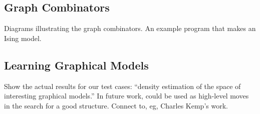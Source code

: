 \documentclass{article} %
\begin{document}
\subsection{Graph Combinators}

Diagrams illustrating the graph combinators. An example program that makes an Ising model.

\subsection{Learning Graphical Models}

Show the actual results for our test cases: ``density estimation of the space of interesting graphical models.''
In future work, could be used as high-level moves in the search for a good structure.
Connect to, eg, Charles Kemp's work.
\end{document}
